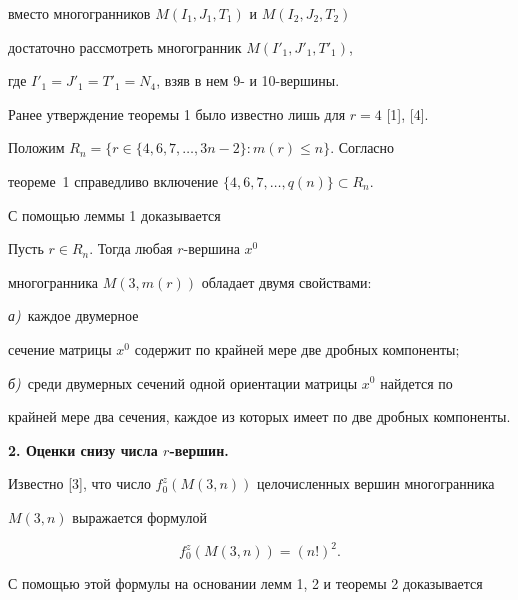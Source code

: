 вместо многогранников $M(I_1,J_1,T_1)$ и $M(I_2,J_2,T_2)$


достаточно рассмотреть многогранник $M(I'_1,J'_1,T'_1)$,


где $I'_1=J'_1=T'_1=N_4$, взяв в нем 9- и 10-вершины.





Ранее утверждение теоремы 1 было известно лишь для $r=4$ [1], [4].





Положим $R_n=\{r\in\{4,6,7,\dotsc,3n-2\}: m(r)\leq n\}.$ Согласно


теореме~1 справедливо включение $\{4,6,7,\dotsc,q(n)\}\subset R_n$.





С помощью леммы 1 доказывается





\begin{thm}


Пусть $r\in R_n$. Тогда любая $r$-вершина $x^0$


многогранника $M(3,m(r))$ обладает двумя свойствами$:$


{\em а)}~каждое двумерное


сечение матрицы $x^0$ содержит по крайней мере две дробных компоненты$;$


{\em б)}~среди двумерных сечений одной ориентации матрицы $x^0$ найдется по


крайней мере два сечения, каждое из которых имеет по две дробных компоненты.


\end{thm}





{\bf 2. Оценки снизу числа $r$-вершин.}


Известно [3], что число $f_0^z(M(3,n))$ целочисленных вершин многогранника


$M(3,n)$ выражается формулой


$$


f_0^z(M(3,n))=(n!)^2.


$$





С помощью этой формулы на основании лемм 1, 2 и теоремы 2 доказывается





